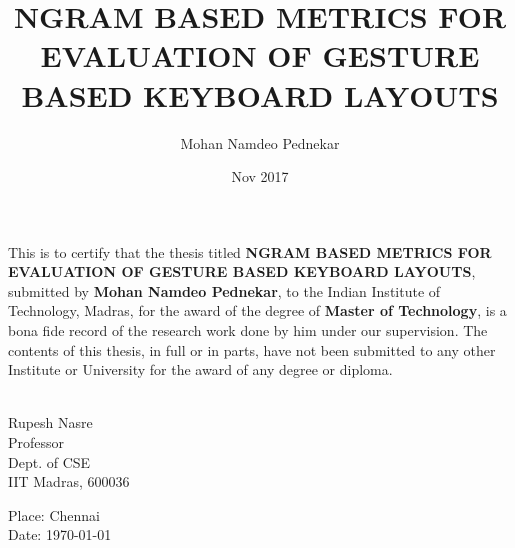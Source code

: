 \documentclass[MTech]{iitmdiss}
\begin{document}

\title{NGRAM BASED METRICS FOR EVALUATION OF GESTURE BASED KEYBOARD LAYOUTS}

\author{Mohan Namdeo Pednekar}

\date{Nov 2017}

\maketitle
\certificate

\vspace*{0.5in}

\noindent This is to certify that the thesis titled {\bf NGRAM BASED METRICS FOR EVALUATION OF GESTURE BASED KEYBOARD LAYOUTS}, submitted by {\bf Mohan Namdeo Pednekar}, 
  to the Indian Institute of Technology, Madras, for
the award of the degree of {\bf Master of Technology}, is a bona fide
record of the research work done by him under our supervision.  The
contents of this thesis, in full or in parts, have not been submitted
to any other Institute or University for the award of any degree or
diploma.

\vspace*{1.5in}

\begin{singlespacing}
\hspace*{-0.25in}
\parbox{2.5in}{
 \\
\noindent Rupesh Nasre \\ 
\noindent Professor \\
\noindent Dept. of CSE\\
\noindent IIT Madras, 600036
} 
\hspace*{1.0in} 
\end{singlespacing}
\vspace*{0.25in}
\noindent Place: Chennai\\
Date: \today 
\end{document}
